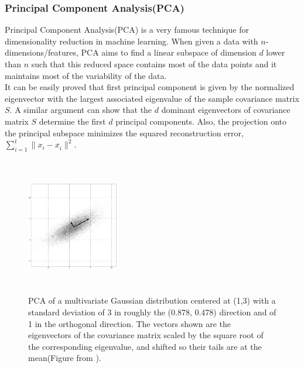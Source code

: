 \documentclass[11pt,a4paper]{article}
\begin{document}
\subsubsection{Principal Component Analysis(PCA)}
Principal Component Analysis(PCA) is a very famous technique for dimensionality reduction in machine learning. When given a data with $n$-dimensions/features, PCA aims to find a linear subspace of dimension $d$ lower than $n$ such that this reduced space contains most of the data points and it maintains most of the variability of the data.\\
It can be easily proved that first principal component is given by the normalized eigenvector with the largest associated eigenvalue of the sample covariance matrix $S$. A similar argument can show that the $d$ dominant eigenvectors of covariance matrix $S$ determine the first $d$ principal components. Also, the projection onto the principal subspace minimizes the squared reconstruction error,
$\sum_{i=1}^{t}\|x_i-x_i^{\widehat{}}\|^{2}$.
\begin{figure}[ht!]
\centering
\includegraphics[width=40mm, height=60mm]{img/pca.eps}
\caption{PCA of a multivariate Gaussian distribution centered at (1,3) with a standard deviation of 3 in roughly the (0.878, 0.478) direction and of 1 in the orthogonal direction. The vectors shown are the eigenvectors of the covariance matrix scaled by the square root of the corresponding eigenvalue, and shifted so their tails are at the mean(Figure from \cite{wiki:2015}). \label{fig:pca}}
\end{figure}
\end{document}
